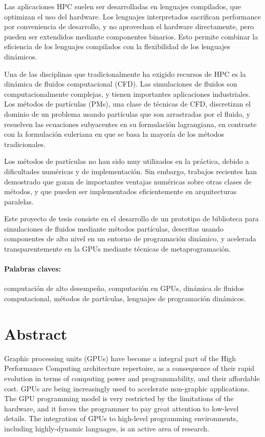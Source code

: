 \documentclass[11pt,spanish]{article}
\begin{document}
Las aplicaciones HPC suelen ser desarrolladas en lenguajes compilados, que
optimizan el uso del hardware.  Los lenguajes interpretados sacrifican
performance por conveniencia de desarrollo, y no aprovechan el hardware
directamente, pero pueden ser extendidos mediante componentes binarios.  Esto
permite combinar la eficiencia de los lenguajes compilados con la flexibilidad
de los lenguajes dinámicos.

Una de las disciplinas que tradicionalmente ha exigido recursos de HPC es la
dinámica de fluidos computacional (CFD).  Las simulaciones de fluidos son
computacionalmente complejas, y tienen importantes aplicaciones industriales.
Los métodos de partículas (PMs), una clase de técnicas de CFD, discretizan el
dominio de un problema usando partículas que son arrastradas por el fluido, y
resuelven las ecuaciones subyacentes en su formulación lagrangiana, en 
contraste con la formulación euleriana en que se basa la mayoría de los métodos
tradicionales.

Los métodos de partículas no han sido muy utilizados en la práctica, debido a
dificultades numéricas y de implementación.  Sin embargo, trabajos recientes han
demostrado que gozan de importantes ventajas numéricas sobre otras clases de
métodos, y que pueden ser implementados eficientemente en arquitecturas
paralelas.

Este proyecto de tesis consiste en el desarrollo de un prototipo de biblioteca
para simulaciones de fluidos mediante métodos partículas, descritas usando
componentes de alto nivel en un entorno de programación dinámico, y acelerada
transparentemente en la GPUs mediante técnicas de metaprogramación.

\paragraph{Palabras claves:}
computación de alto desempeño,
computación en GPUs,
dinámica de fluidos computacional,
métodos de partículas,
lenguajes de programación dinámicos.

\newpage
\section*{Abstract}
Graphic processing units (GPUs) have become a integral part
of the High Performance Computing architecture repertoire, as a consequence of
their rapid evolution in terms of computing power and programmability, and their
affordable cost.  GPUs are being increasingly used to accelerate non-graphic
applications.  The GPU programming model is very restricted by the limitations
of the hardware, and it forces the programmer to pay great attention to low-level
details.  The integration of GPUs to high-level programming environments,
including highly-dynamic languages, is an active area of research.
\end{document}
